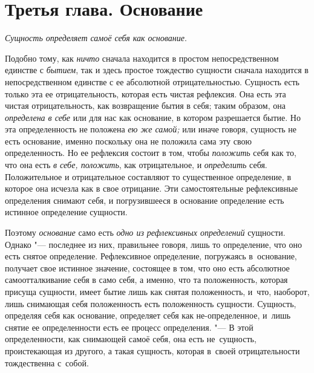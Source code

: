 \chapter[{\em Третья глава} Основание]{Третья глава. Основание}

{\em Сущность определяет самоё себя как основание}.

Подобно тому, как {\em ничто} сначала находится в простом непосредственном
единстве с {\em бытием}, так и здесь простое тождество сущности сначала
находится в непосредственном единстве с ее абсолютной отрицательностью.
Сущность есть только эта ее отрицательность, которая есть чистая рефлексия. Она
есть эта чистая отрицательность, как возвращение бытия в себя; таким образом,
она {\em определена в себе} или для нас как основание, в котором разрешается
бытие. Но эта определенность не положена {\em ею же самой;} или иначе говоря,
сущность не есть основание, именно поскольку она не положила сама эту свою
определенность. Но ее рефлексия состоит в том, чтобы {\em положить} себя как
то, что она есть {\em в себе, положить}, как отрицательное, и {\em определить}
себя. Положительное и отрицательное составляют то существенное определение,
в которое она исчезла как в свое отрицание. Эти самостоятельные рефлексивные
определения снимают себя, и погрузившееся в основание определение есть истинное
определение сущности.

Поэтому {\em основание} само есть {\em одно из рефлексивных определений}
сущности. Однако "--- последнее из них, правильнее говоря, лишь то определение,
что оно есть снятое определение. Рефлексивное определение, погружаясь
в~основание, получает свое истинное значение, состоящее в том, что оно есть
абсолютное самоотталкивание себя в само себя, а именно, что та положенность,
которая присуща сущности, имеет бытие лишь как снятая положенность, и~что,
наоборот, лишь снимающая себя положенность есть положенность сущности.
Сущность, определяя себя как основание, определяет себя как не-определенное,
и~лишь снятие ее определенности есть ее процесс определения. "--- В этой
определенности, как снимающей самоё себя, она есть не~сущность, проистекающая
из другого, а такая сущность, которая в~своей отрицательности тождественна
с~собой.

